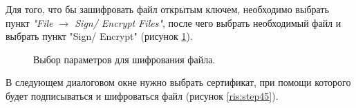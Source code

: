 \documentclass[10pt,a4paper]{report}
\begin{document}
Для того, что бы зашифровать файл открытым ключем, необходимо выбрать пункт \textit{"File \begin{math}\to\end{math} Sign/ Encrypt Files"}, после чего выбрать необходимый файл и выбрать пункт "Sign/ Encrypt" (рисунок \ref{ris:step44}).

\begin{figure}[h]
	\caption{Выбор параметров для шифрования файла.}
	\label{ris:step44}
\end{figure}

В следующем диалоговом окне нужно выбрать сертификат, при помощи которого будет подписываться и шифроваться файл (рисунок \ref{ris:step45}).
\end{document}
